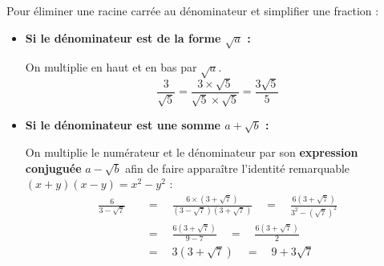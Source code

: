 \begin{meth}
	Pour éliminer une racine carrée au dénominateur et simplifier une fraction :

	\begin{itemize}
		\item \textbf{Si le dénominateur est de la forme $\sqrt{a}$ :}

		      On multiplie en haut et en bas par $\sqrt{a}$.
		      \[
			      \frac{3}{\sqrt{5}} = \frac{3 \times \sqrt{5}}{\sqrt{5} \times \sqrt{5}} = \frac{3\sqrt{5}}{5}
		      \]
		\item \textbf{Si le dénominateur est une somme $a + \sqrt{b}$ :}

		      On multiplie le numérateur et le dénominateur par son \textbf{expression conjuguée} $a - \sqrt{b}$ afin de faire apparaître l'identité remarquable $(x + y)(x - y) = x^2 - y^2$ :
		      \begin{align*}
			      \frac{6}{3 - \sqrt{7}} & \quad = \quad \frac{6 \times (3 + \sqrt{7})}{(3 - \sqrt{7})(3 + \sqrt{7})} \quad = \quad \frac{6(3 + \sqrt{7})}{3^2 - \left( \sqrt{7} \right)^2} \\[2ex]
			                             & \quad = \quad \frac{6(3 + \sqrt{7})}{9 - 7} \quad = \quad \frac{6(3 + \sqrt{7})}{2}                                                              \\[2ex]
			                             & \quad = \quad 3(3 + \sqrt{7}) \quad = \quad 9 + 3\sqrt{7}
		      \end{align*}
	\end{itemize}
\end{meth}
